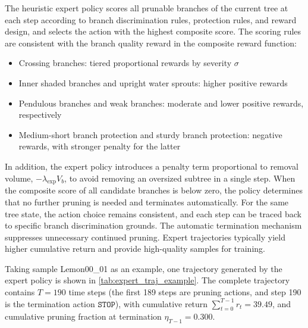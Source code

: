 \documentclass[12pt,a4paper,fontset=fandol]{ctexart}
\begin{document}
The heuristic expert policy scores all prunable branches of the current tree at each step according to branch discrimination rules, protection rules, and reward design,
and selects the action with the highest composite score.
The scoring rules are consistent with the branch quality reward in the composite reward function:

\begin{itemize}[nosep]
  \item Crossing branches: tiered proportional rewards by severity $\sigma$
  \item Inner shaded branches and upright water sprouts: higher positive rewards
  \item Pendulous branches and weak branches: moderate and lower positive rewards, respectively
  \item Medium-short branch protection and sturdy branch protection: negative rewards, with stronger penalty for the latter
\end{itemize}

In addition, the expert policy introduces a penalty term proportional to removal volume, $-\lambda_{\text{exp}} V_b$,
to avoid removing an oversized subtree in a single step.
When the composite score of all candidate branches is below zero,
the policy determines that no further pruning is needed and terminates automatically.
For the same tree state, the action choice remains consistent,
and each step can be traced back to specific branch discrimination grounds.
The automatic termination mechanism suppresses unnecessary continued pruning.
Expert trajectories typically yield higher cumulative return
and provide high-quality samples for training.

Taking sample Lemon00\_01 as an example, one trajectory generated by the expert policy is shown in \cref{tab:expert_traj_example}.
The complete trajectory contains $T = 190$ time steps (the first 189 steps are pruning actions, and step 190 is the termination action $\texttt{STOP}$),
with cumulative return $\sum_{t=0}^{T-1} r_t = 39.49$,
and cumulative pruning fraction at termination $\eta_{T-1} = 0.300$.
\end{document}
